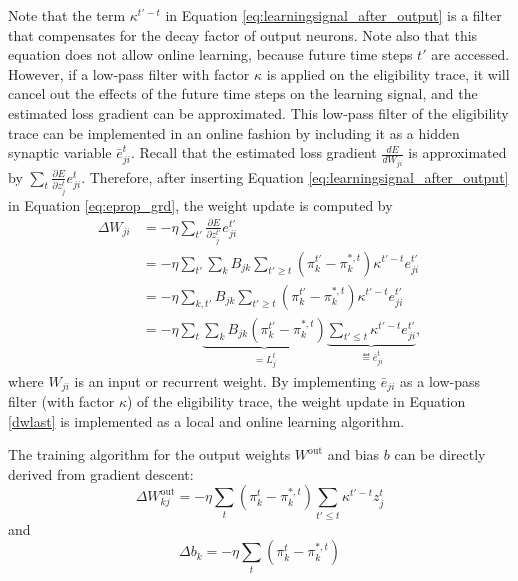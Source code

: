             Note that the term $\kappa^{t'-t}$ in Equation \ref{eq:learningsignal_after_output} is a filter that compensates for the decay factor of output neurons.
            Note also that this equation does not allow online learning, because future time steps $t'$ are accessed.
            However, if a low-pass filter with factor $\kappa$ is applied on the eligibility trace, it will cancel out the effects of the future time steps on the learning signal, and the estimated loss gradient can be approximated.
            This low-pass filter of the eligibility trace can be implemented in an online fashion by including it as a hidden synaptic variable $\bar{e}^t_{ji}$.
            Recall that the estimated loss gradient $\frac{dE}{dW_{ji}}$ is approximated by $\sum_t \frac{\partial E}{\partial z^t_j}e^t_{ji}$.
            Therefore, after inserting Equation \ref{eq:learningsignal_after_output} in Equation \ref{eq:eprop_grd}, the weight update is computed by
            \begin{align}
            \Delta W_{ji} &= -\eta\sum_{t'}\frac{\partial E}{\partial z^{t'}_j}e^{t'}_{ji}\\
            &= -\eta\sum_{t'}\sum_kB_{jk}\sum_{t'\geq t}\left(\pi^{t'}_k - \pi^{*,t}_k\right)\kappa^{t'-t}e^{t'}_{ji}\\
            &= -\eta\sum_{k, t'}B_{jk}\sum_{t'\geq t}\left(\pi^{t'}_k - \pi^{*,t}_k\right)\kappa^{t'-t}e^{t'}_{ji}\\
            &= -\eta\sum_t\underbrace{\sum_kB_{jk}\left(\pi^{t'}_k - \pi^{*,t}_k\right)}_{=L^t_j}\underbrace{\sum_{t'\leq t}\kappa^{t'-t}e^{t'}_{ji}}_{\eqdef \bar{e}^t_{ji}}\label{dwlast},
            \end{align}
            where $W_{ji}$ is an input or recurrent weight.
            By implementing $\bar{e}_{ji}$ as a low-pass filter (with factor $\kappa$) of the eligibility trace, the weight update in Equation \ref{dwlast} is implemented as a local and online learning algorithm.

            The training algorithm for the output weights $W^\text{out}$ and bias $b$ can be directly derived from gradient descent:
            \begin{equation}
            \Delta W^\text{out}_{kj} = -\eta \sum_t\left(\pi^t_k - \pi^{*,t}_k\right)\sum_{t'\leq t}\kappa^{t'-t}z^t_j
            \end{equation}
            and
            \begin{equation}
            \Delta b_k = -\eta \sum_t\left(\pi^t_k - \pi^{*,t}_k\right)
            \end{equation}

